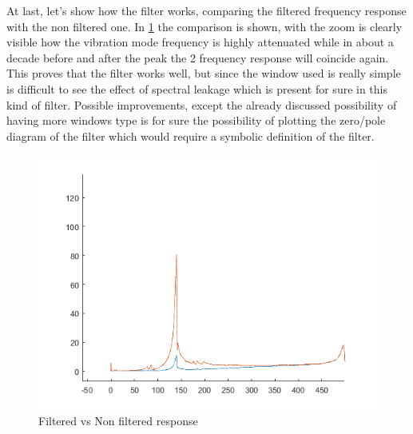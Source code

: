 \documentclass[12pt,a4paper,twoside]{article}
\begin{document}
At last, let's show how the filter works, comparing the filtered frequency response with the non filtered one. In  \figurename{ \ref{compare}} the comparison is shown, with the zoom is clearly visible how the vibration mode frequency is highly attenuated while in about a decade before and after the peak the 2 frequency response will coincide again. This proves that the filter works well, but since the window used is really simple is difficult to see the effect of spectral leakage which is present for sure in this kind of filter. Possible improvements, except the already discussed possibility of having more windows type is for sure the possibility of plotting the zero/pole diagram of the filter which would require a symbolic definition of the filter.


\begin{figure}[h!]
	\centering
	\includegraphics[width=0.8\linewidth]{Images/comparison.png}
	\caption{Filtered vs Non filtered response}
	\label{compare}
\end{figure}
\noindent
\end{document}
